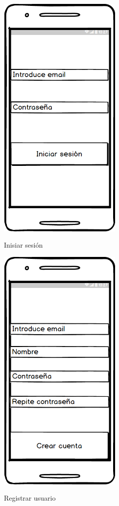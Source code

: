 	
	\begin{figure}[htbp]
\begin{minipage}[b]{0.5\linewidth} %
\centering
\includegraphics[width=6cm]{maqueta/Iniciar.png}
 \label{figura1}
\caption{Inisiar sesión}

\end{minipage}
\hspace{0.5cm} %
\begin{minipage}[b]{0.5\linewidth}
\centering
\includegraphics[width=6cm]{maqueta/Registrarse.png}
 \label{figura2}
\caption{Registrar usuario}

\end{minipage}
\end{figure}










